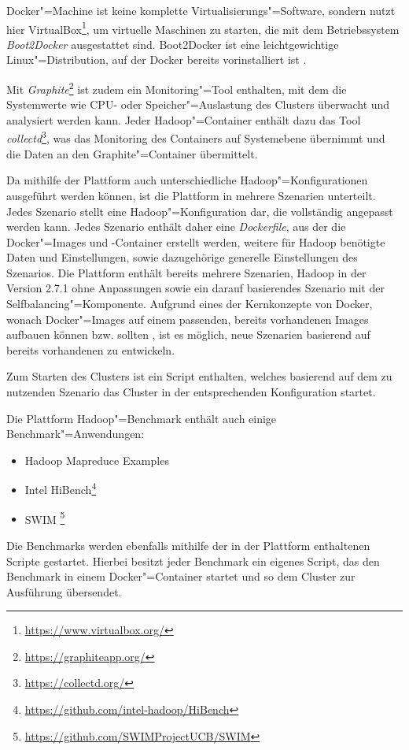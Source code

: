 Docker"=Machine ist keine komplette Virtualisierungs"=Software, sondern nutzt hier VirtualBox\footnote{\url{https://www.virtualbox.org/}}, um virtuelle Maschinen zu starten, die mit dem Betriebssystem \emph{Boot2Docker} ausgestattet sind.
Boot2Docker ist eine leichtgewichtige Linux"=Distribution, auf der Docker bereits vorinstalliert ist \cite{DockerMachineGettingStartedVm}.

Mit \emph{Graphite}\footnote{\url{https://graphiteapp.org/}} ist zudem ein Monitoring"=Tool enthalten, mit dem die Systemwerte wie CPU- oder Speicher"=Auslastung des Clusters überwacht und analysiert werden kann.
Jeder Hadoop"=Container enthält dazu das Tool \emph{collectd}\footnote{\url{https://collectd.org/}}, was das Monitoring des Containers auf Systemebene übernimmt und die Daten an den Graphite"=Container übermittelt.

Da mithilfe der Plattform auch unterschiedliche Hadoop"=Konfigurationen ausgeführt werden können, ist die Plattform in mehrere Szenarien unterteilt.
Jedes Szenario stellt eine Hadoop"=Konfiguration dar, die vollständig angepasst werden kann.
Jedes Szenario enthält daher eine \emph{Dockerfile}, aus der die Docker"=Images und -Container erstellt werden, weitere für Hadoop benötigte Daten und Einstellungen, sowie dazugehörige generelle Einstellungen des Szenarios.
Die Plattform enthält bereits mehrere Szenarien, \uA Hadoop in der Version 2.7.1 ohne Anpassungen sowie ein darauf basierendes Szenario mit der Selfbalancing"=Komponente.
Aufgrund eines der Kernkonzepte von Docker, wonach Docker"=Images auf einem passenden, bereits vorhandenen Images aufbauen können bzw. sollten \cite{DockerdevBestPractice}, ist es möglich, neue Szenarien basierend auf bereits vorhandenen zu entwickeln.

Zum Starten des Clusters ist ein Script enthalten, welches basierend auf dem zu nutzenden Szenario das Cluster in der entsprechenden Konfiguration startet.

Die Plattform Hadoop"=Benchmark enthält auch einige Benchmark"=Anwendungen:

\begin{itemize}
    \item Hadoop Mapreduce Examples
    \item Intel HiBench\footnote{\url{https://github.com/intel-hadoop/HiBench}}
    \item \ac{SWIM} \footnote{\url{https://github.com/SWIMProjectUCB/SWIM}}
\end{itemize}

Die Benchmarks werden ebenfalls mithilfe der in der Plattform enthaltenen Scripte gestartet.
Hierbei besitzt jeder Benchmark ein eigenes Script, das den Benchmark in einem Docker"=Container startet und so dem Cluster zur Ausführung übersendet.

